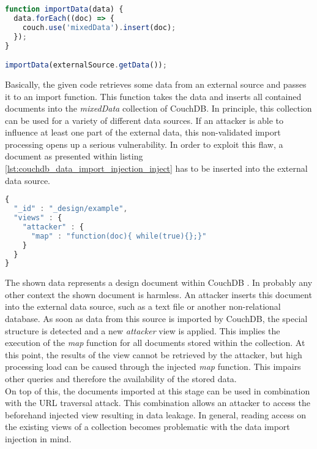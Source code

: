 \begin{lstlisting}[caption={Vulnerable NodeJS example for data import injection against CouchDB}, label={lst:couchdb_data_import_injection_app}, language=JavaScript]
function importData(data) {
  data.forEach((doc) => {
    couch.use('mixedData').insert(doc);
  });
}

importData(externalSource.getData());
\end{lstlisting}

Basically, the given code retrieves some data from an external source and passes it to an import function. This function takes the data and inserts all contained documents into the \emph{mixedData} collection of CouchDB. In principle, this collection can be used for a variety of different data sources. If an attacker is able to influence at least one part of the external data, this non-validated import processing opens up a serious vulnerability. In order to exploit this flaw, a document as presented within listing \ref{lst:couchdb_data_import_injection_inject} has to be inserted into the external data source. \\

\begin{lstlisting}[caption={Critical document for data import injection against CouchDB}, label={lst:couchdb_data_import_injection_inject}, language=JavaScript]
{
  "_id" : "_design/example",
  "views" : {
    "attacker" : {
      "map" : "function(doc){ while(true){};}"
    }
  }
}
\end{lstlisting}

The shown data represents a design document within CouchDB \cite{Anderson:2010b}. In probably any other context the shown document is harmless. An attacker inserts this document into the external data source, such as a text file or another non-relational database. As soon as data from this source is imported by CouchDB, the special structure is detected and a new \emph{attacker} view is applied. This implies the execution of the \emph{map} function for all documents stored within the collection. At this point, the results of the view cannot be retrieved by the attacker, but high processing load can be caused through the injected \emph{map} function. This impairs other queries and therefore the availability of the stored data. \\

On top of this, the documents imported at this stage can be used in combination with the URL traversal attack. This combination allows an attacker to access the beforehand injected view resulting in data leakage. In general, reading access on the existing views of a collection becomes problematic with the data import injection in mind. \\

